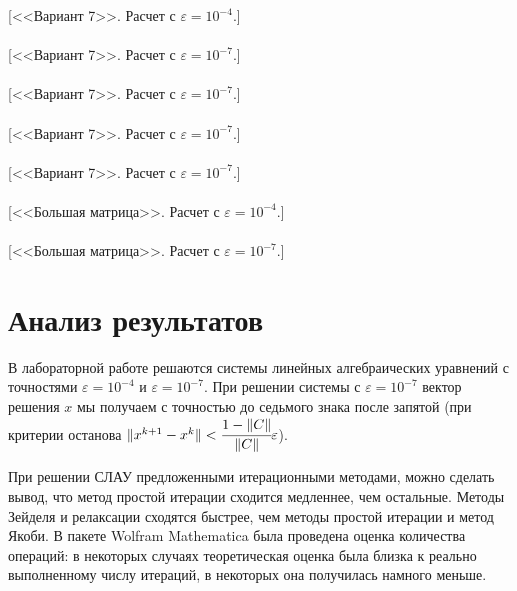 \documentclass[12pt,a4paper]{article}
\begin{document}
[<<Вариант 7>>. Расчет с $\varepsilon=10^{-4}$.]\\
\\
[<<Вариант 7>>. Расчет с $\varepsilon=10^{-7}$.]\\
\\
[<<Вариант 7>>. Расчет с $\varepsilon=10^{-7}$.]\\
\\
[<<Вариант 7>>. Расчет с $\varepsilon=10^{-7}$.]\\
\\
[<<Вариант 7>>. Расчет с $\varepsilon=10^{-7}$.]\\
\\
[<<Большая матрица>>. Расчет с $\varepsilon=10^{-4}$.]\\
\\
[<<Большая матрица>>. Расчет с $\varepsilon=10^{-7}$.]\\

\section{Анализ результатов}

В лабораторной работе решаются системы линейных алгебраических уравнений с точностями $\varepsilon=10^{-4}$ и $\varepsilon=10^{-7}$. При решении системы с $\varepsilon=10^{-7}$ вектор решения $x$ мы получаем с точностью до седьмого знака после запятой (при критерии останова $\|x^{k+1}-x^k\|<\cfrac{1-\|C\|}{\|C\|} \varepsilon$).

При решении СЛАУ предложенными итерационными методами, можно сделать вывод, что метод простой итерации сходится медленнее, чем остальные. Методы Зейделя и релаксации сходятся быстрее, чем методы простой итерации и метод Якоби. В пакете Wolfram Mathematica была проведена оценка количества операций: в некоторых случаях теоретическая оценка была близка к реально выполненному числу итераций, в некоторых она получилась намного меньше.
\end{document}
